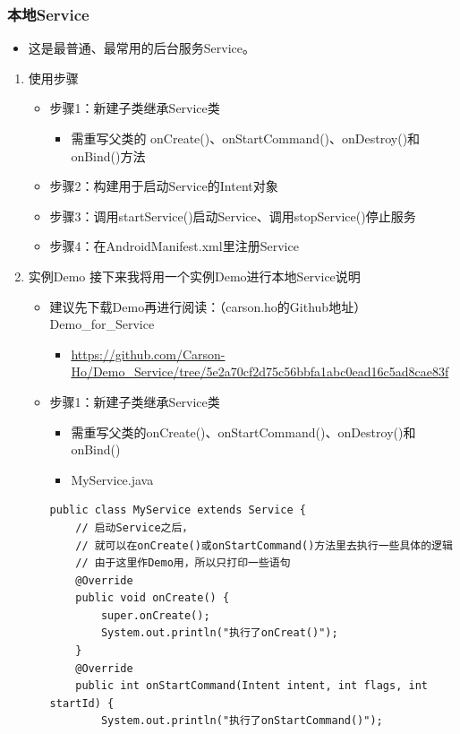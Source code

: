\documentclass[9pt, b5paper]{article}
\begin{document}
\subsubsection{本地Service}
\label{sec-3-4-1}
\begin{itemize}
\item 这是最普通、最常用的后台服务Service。
\end{itemize}
\begin{enumerate}
\item 使用步骤
\label{sec-3-4-1-1}
\begin{itemize}
\item 步骤1：新建子类继承Service类
\begin{itemize}
\item 需重写父类的 onCreate()、onStartCommand()、onDestroy()和onBind()方法
\end{itemize}
\item 步骤2：构建用于启动Service的Intent对象
\item 步骤3：调用startService()启动Service、调用stopService()停止服务
\item 步骤4：在AndroidManifest.xml里注册Service
\end{itemize}
\item 实例Demo
\label{sec-3-4-1-2}
接下来我将用一个实例Demo进行本地Service说明
\begin{itemize}
\item 建议先下载Demo再进行阅读：（carson.ho的Github地址）Demo\_for\_Service
\begin{itemize}
\item \url{https://github.com/Carson-Ho/Demo_Service/tree/5e2a70cf2d75c56bbfa1abc0ead16c5ad8cae83f}
\end{itemize}
\item 步骤1：新建子类继承Service类
\begin{itemize}
\item 需重写父类的onCreate()、onStartCommand()、onDestroy()和onBind()
\item MyService.java
\end{itemize}
\begin{verbatim}
public class MyService extends Service {
    // 启动Service之后，
    // 就可以在onCreate()或onStartCommand()方法里去执行一些具体的逻辑
    // 由于这里作Demo用，所以只打印一些语句
    @Override
    public void onCreate() {
        super.onCreate();
        System.out.println("执行了onCreat()");
    }
    @Override
    public int onStartCommand(Intent intent, int flags, int startId) {
        System.out.println("执行了onStartCommand()");

\end{verbatim}
\end{itemize}
\end{enumerate}
\end{document}
